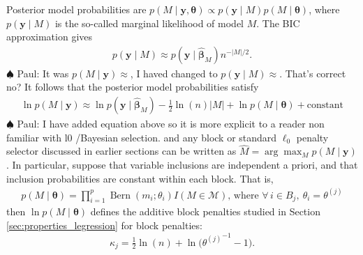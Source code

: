 \documentclass[aos]{imsart}
\theoremstyle{plain}
\newcommand{\paul}[1]{{\small{\color{green} \sf $\spadesuit$ Paul: #1}}}
\newcommand{\bs}{\boldsymbol}
\begin{document}
Posterior model probabilities are $p(M \mid \bs y, \bs \theta) \propto p(\bs y \mid M) p(M \mid \bs \theta)$, where $p(\bs y \mid M)$ is the so-called marginal likelihood of model $M$. The BIC approximation \citep{BIC} gives
\begin{align*}
 p( \bs y  \mid M)\approx p(\bs y \mid \hat{\bs \beta}_M)n^{-|M|/2}.
\end{align*}
\paul{It was $p( M \mid \bs y ) \approx$, I haved changed to $p( \bs y  \mid M) \approx$. That's correct no?}
It follows that the posterior model probabilities satisfy
\begin{align*}
\ln p(M \mid\bs y) \approx \ln p(\bs y \mid \hat{\bs \beta}_M) - \frac{1}{2}\ln(n)|M| + \ln p(M\mid\bs \theta) + \text{constant}
\end{align*}
\paul{I have added equation above so it is more explicit to a reader non familiar with l0 /Bayesian selection.}
and any block or standard $\ell_0$ penalty selector discussed in earlier sections can be written as $\hat{M}= \arg\max_M p(M \mid \bs y)$. 
In particular, suppose that variable inclusions are independent a priori, and that inclusion probabilities are constant within each block. That is,
\begin{align} \label{eq:block_modelprior}
p( M \mid \boldsymbol{\theta})=
        \prod_{i=1}^p \operatorname{Bern}\left(m_i ; \theta_i\right) I(M \in \mathcal{M}) \mbox{, where } \forall \, i\in B_j, \: \theta_i=\theta^{(j)}
\end{align}
then $\ln p(M \mid \bs \theta)$ defines the additive block penalties studied in Section \ref{sec:properties_legression} for block penalties:
\begin{equation}\label{eq:blockpenpriorinclu}
    \kappa_j=\tfrac{1}{2}\ln(n)+\ln\big({\theta^{(j)}}^{-1}-1\big).
\end{equation}
\end{document}
